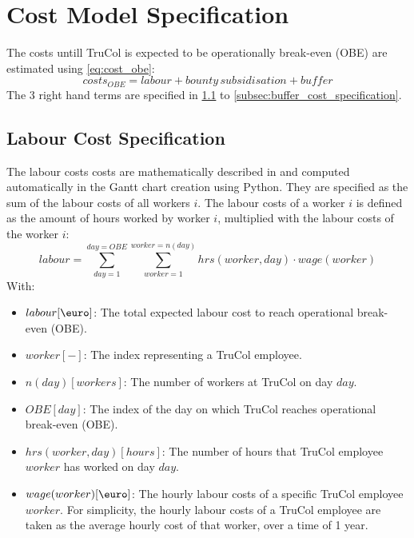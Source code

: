 \section{Cost Model Specification}\label{sec:cost_model_specification}
The costs untill TruCol is expected to be operationally break-even (OBE) are estimated using \cref{eq:cost_obe}:
\begin{equation}
	costs_{OBE}=labour+{bounty\, subsidisation}+buffer
	\label{eq:cost_obe}
\end{equation}
The 3 right hand terms are specified in \cref{subsec:labour_cost_specification} to \cref{subsec:buffer_cost_specification}.

\subsection{Labour Cost Specification}\label{subsec:labour_cost_specification}
The labour costs costs are mathematically described in  and computed automatically in the Gantt chart creation using Python. They are specified as the sum of the labour costs of all workers $i$. The labour costs of a worker $i$ is defined as the amount of hours worked by worker $i$, multiplied with the labour costs of the worker $i$:
\begin{equation}
	labour=\sum_{day=1}^{day=OBE} \sum_{worker=1} ^{worker=n(day)} hrs(worker,day)\cdot wage(worker)
	\label{eq:labour_costs}
\end{equation}
With:
\begin{itemize}
	\item $labour [\text{\euro}]$: The total expected labour cost to reach operational break-even (OBE).
	\item $worker [-]$: The index representing a TruCol employee.
	\item $n(day) [workers]$: The number of workers at TruCol on day $day$.
	\item $OBE [day]$: The index of the day on which TruCol reaches operational break-even  (OBE).
	\item $hrs(worker,day) [hours]$: The number of hours that TruCol employee $worker$ has worked on day $day$.
	\item $wage(worker) [\text{\euro}]$: The hourly labour costs of a specific TruCol employee $worker$. For simplicity, the hourly labour costs of a TruCol employee are taken as the average hourly cost of that worker, over a time of 1 year.
\end{itemize}

